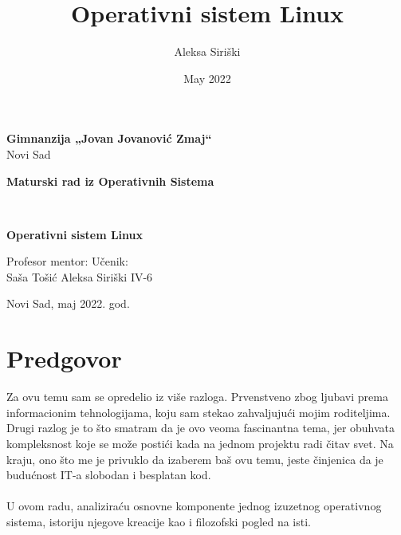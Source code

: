 \documentclass[a4paper,14pt]{article}
\title{Operativni sistem Linux}
\author{Aleksa Siriški}
\date{May 2022}
\begin{document}
\pagestyle{empty}
\begin{center}
\textbf{Gimnanzija „Jovan Jovanović Zmaj“}
\\
Novi Sad
\end{center}
\vfill
\begin{center}
	\begin{large}
		\textbf{Maturski rad iz Operativnih Sistema}
		\bigskip 
	\end{large}
	\\
	\begin{huge}
        \textbf{Operativni sistem Linux}
	\end{huge}
\end{center}
\vfill
\begin{normalsize}
Profesor mentor:
\hfill
Učenik:
\\
Saša Tošić
\hfill
Aleksa Siriški IV-6
\end{normalsize}
\vfill
\begin{center}
Novi Sad, maj 2022. god.
\end{center}
\newpage

\pagestyle{plain}
\section{Predgovor}
Za ovu temu sam se opredelio iz više razloga. Prvenstveno zbog ljubavi prema informacionim tehnologijama, koju sam stekao zahvaljujući mojim roditeljima. Drugi razlog je to što smatram da je ovo veoma fascinantna tema, jer obuhvata kompleksnost koje se može postići kada na jednom projektu radi čitav svet. Na kraju, ono što me je privuklo da izaberem baš ovu temu, jeste činjenica da je budućnost IT-a slobodan i besplatan kod.
\\\\
U ovom radu, analiziraću osnovne komponente jednog izuzetnog operativnog sistema, istoriju njegove kreacije kao i filozofski pogled na isti.
\newpage

\renewcommand{\contentsname}{Sadržaj}
\tableofcontents
\newpage

\pagestyle{fancy}
\fancyhf{}
\cfoot{\thepage}
\end{document}
